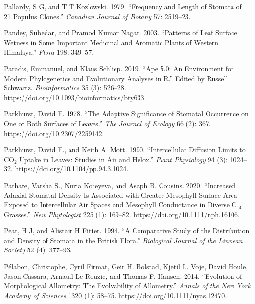 \documentclass[
  12pt,
]{article}
\newlength{\cslhangindent}
\newlength{\cslentryspacingunit} %
\newenvironment{CSLReferences}[2] %
 {%
  \setlength{\parindent}{0pt}
  \ifodd #1
  \let\oldpar\par
  \def\par{\hangindent=\cslhangindent\oldpar}
  \fi
  \setlength{\parskip}{#2\cslentryspacingunit}
 }%
 {}
\begin{document}
\begin{CSLReferences}{1}{0}
\leavevmode{}%
Pallardy, S G, and T T Kozlowski. 1979. {``Frequency and Length of Stomata of 21 {Populus} Clones.''} \emph{Canadian Journal of Botany} 57: 2519--23.

\leavevmode{}%
Pandey, Subedar, and Pramod Kumar Nagar. 2003. {``Patterns of Leaf Surface Wetness in Some Important Medicinal and Aromatic Plants of {Western} {Himalaya}.''} \emph{Flora} 198: 349--57.

\leavevmode{}%
Paradis, Emmanuel, and Klaus Schliep. 2019. {``Ape 5.0: An Environment for Modern Phylogenetics and Evolutionary Analyses in {R}.''} Edited by Russell Schwartz. \emph{Bioinformatics} 35 (3): 526--28. \url{https://doi.org/10.1093/bioinformatics/bty633}.

\leavevmode{}%
Parkhurst, David F. 1978. {``The {Adaptive} {Significance} of {Stomatal} {Occurrence} on {One} or {Both} {Surfaces} of {Leaves}.''} \emph{The Journal of Ecology} 66 (2): 367. \url{https://doi.org/10.2307/2259142}.

\leavevmode{}%
Parkhurst, David F., and Keith A. Mott. 1990. {``Intercellular Diffusion Limits to {CO}\(_{\textrm{2}}\) Uptake in Leaves: Studies in Air and Helox.''} \emph{Plant Physiology} 94 (3): 1024--32. \url{https://doi.org/10.1104/pp.94.3.1024}.

\leavevmode{}%
Pathare, Varsha S., Nuria Koteyeva, and Asaph B. Cousins. 2020. {``Increased Adaxial Stomatal Density Is Associated with Greater Mesophyll Surface Area Exposed to Intercellular Air Spaces and Mesophyll Conductance in Diverse {C} \(_{\textrm{4}}\) Grasses.''} \emph{New Phytologist} 225 (1): 169--82. \url{https://doi.org/10.1111/nph.16106}.

\leavevmode{}%
Peat, H J, and Alistair H Fitter. 1994. {``A Comparative Study of the Distribution and Density of Stomata in the {British} Flora.''} \emph{Biological Journal of the Linnean Society} 52 (4): 377--93.

\leavevmode{}%
Pélabon, Christophe, Cyril Firmat, Geir H. Bolstad, Kjetil L. Voje, David Houle, Jason Cassara, Arnaud Le Rouzic, and Thomas F. Hansen. 2014. {``Evolution of Morphological Allometry: {The} Evolvability of Allometry.''} \emph{Annals of the New York Academy of Sciences} 1320 (1): 58--75. \url{https://doi.org/10.1111/nyas.12470}.


\end{CSLReferences}
\end{document}
